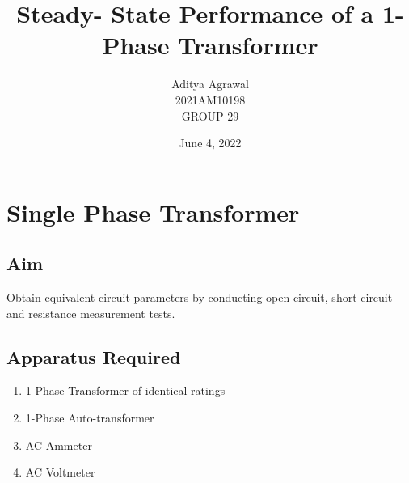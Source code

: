 \documentclass{article}
\title{Steady- State Performance of a 1-Phase Transformer}
\author{Aditya Agrawal\\2021AM10198\\GROUP 29}
\date{June 4, 2022}
\begin{document}
\maketitle
\tableofcontents
\newpage
\section{Single Phase Transformer}
\subsection{Aim}
Obtain equivalent circuit parameters by conducting open-circuit, short-circuit
and resistance measurement tests.
\subsection{Apparatus Required}
\begin{enumerate}
    \item 1-Phase Transformer of identical ratings
    \item 1-Phase Auto-transformer
    \item AC Ammeter
    \item AC Voltmeter
\end{enumerate}
\end{document}
